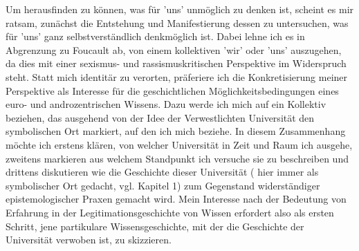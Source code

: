 Um herausfinden zu können, was für 'uns' unmöglich zu denken ist, scheint es mir
ratsam, zunächst die Entstehung und Manifestierung dessen zu untersuchen, was
für 'uns' ganz selbstverständlich denkmöglich ist. Dabei lehne ich es in
Abgrenzung zu Foucault ab, von einem kollektiven 'wir' oder 'uns' auszugehen, da
dies mit einer sexismus- und rassismuskritischen Perspektive im Widerspruch
steht. Statt mich identitär zu verorten, präferiere ich die Konkretisierung
meiner Perspektive als Interesse für die geschichtlichen Möglichkeitsbedingungen
eines euro- und androzentrischen Wissens. Dazu werde ich mich auf ein Kollektiv
beziehen, das ausgehend von der Idee der \glqq Verwestlichten Universität \grqq 
\footnotemark {} den 
symbolischen Ort markiert, auf den ich mich beziehe. In diesem Zusammenhang
möchte ich erstens klären, von welcher Universität in Zeit und Raum ich ausgehe,
zweitens markieren aus welchem Standpunkt ich versuche sie zu beschreiben und
drittens diskutieren wie die Geschichte dieser Universität ( hier immer als
symbolischer Ort gedacht, vgl. Kapitel 1) zum Gegenstand widerständiger
epistemologischer Praxen gemacht wird. Mein Interesse nach der Bedeutung von
Erfahrung in der Legitimationsgeschichte von Wissen erfordert also als ersten
Schritt, jene partikulare Wissensgeschichte,  mit der die Geschichte der
Universität verwoben ist, zu skizzieren.


